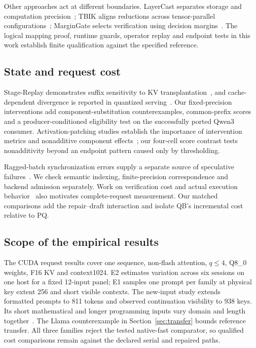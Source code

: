 Other approaches act at different boundaries. LayerCast separates storage and computation precision~\cite{layercast}; TBIK aligns reductions across tensor-parallel configurations~\cite{tbik}; MarginGate selects verification using decision margins~\cite{margingate}. The logical mapping proof, runtime guards, operator replay and endpoint tests in this work establish finite qualification against the specified reference.

\subsection{State and request cost}
Stage-Replay demonstrates suffix sensitivity to KV transplantation~\cite{stagereplay}, and cache-dependent divergence is reported in quantized serving~\cite{cachestate}. Our fixed-precision interventions add component-substitution counterexamples, common-prefix scores and a producer-conditioned eligibility test on the successfully ported Qwen3 consumer. Activation-patching studies establish the importance of intervention metrics and nonadditive component effects~\cite{patching,mediators}; our four-cell score contrast tests nonadditivity beyond an endpoint pattern caused only by thresholding.

Ragged-batch synchronization errors supply a separate source of speculative failures~\cite{forensics}. We check semantic indexing, finite-precision correspondence and backend admission separately. Work on verification cost and actual execution behavior~\cite{illusion,lossless} also motivates complete-request measurement. Our matched comparisons add the repair--draft interaction and isolate QB's incremental cost relative to PQ.

\subsection{Scope of the empirical results}
The CUDA request results cover one sequence, non-flash attention, $q\leq4$, Q8\_0 weights, F16 KV and context1024. E2 estimates variation across six sessions on one host for a fixed 12-input panel; E1 samples one prompt per family at physical key extent 256 and short visible contexts. The new-input study extends formatted prompts to 811 tokens and observed continuation visibility to 938 keys. Its short mathematical and longer programming inputs vary domain and length together~\cite{rtxtransferrecords}. The Llama counterexample in Section~\ref{sec:transfer} bounds reference transfer. All three families reject the tested native-fast comparator, so qualified cost comparisons remain against the declared serial and repaired paths.

